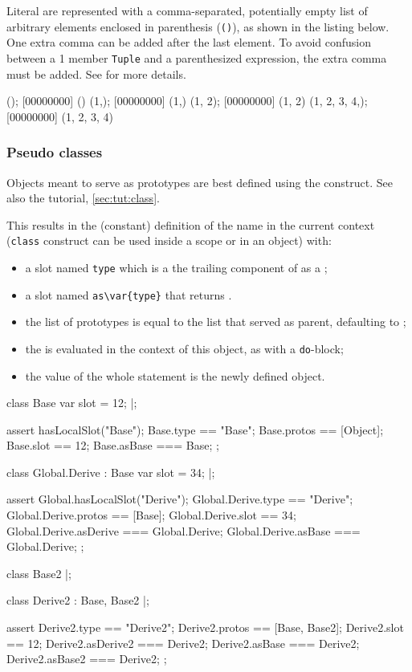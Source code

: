 Literal  are represented with a comma-separated, potentially
empty list of arbitrary elements enclosed in parenthesis (\lstinline|()|),
as shown in the listing below.  One extra comma can be added after the last
element.  To avoid confusion between a 1 member \lstinline{Tuple} and a
parenthesized expression, the extra comma must be added.  See
 for more details.

\begin{urbiscript}
();
[00000000] ()
(1,);
[00000000] (1,)
(1, 2);
[00000000] (1, 2)
(1, 2, 3, 4,);
[00000000] (1, 2, 3, 4)
\end{urbiscript}


\subsubsection{Pseudo classes}
\label{sec:lang:class}

Objects meant to serve as prototypes are best defined using the
 construct.  See also the tutorial, \autoref{sec:tut:class}.


This results in the (constant) definition of the name  in the
current context (\lstinline{class} construct can be used inside a scope or
in an object) with:
\begin{itemize}
\item a slot named \lstinline{type} which is a the trailing component of
   as a ;
\item a slot named \lstinline|as\var{type}| that returns \this.
\item the list of prototypes is equal to the list  that
  served as parent, defaulting to ;
\item the  is evaluated in the context of this object, as with a
  \lstinline{do}-block;
\item the value of the whole statement is the newly defined object.
\end{itemize}

\begin{urbiscript}
class Base
{
  var slot = 12;
}|;

assert
{
  hasLocalSlot("Base");
  Base.type   == "Base";
  Base.protos == [Object];
  Base.slot   == 12;
  Base.asBase === Base;
};

class Global.Derive : Base
{
  var slot = 34;
}|;

assert
{
  Global.hasLocalSlot("Derive");
  Global.Derive.type     == "Derive";
  Global.Derive.protos   == [Base];
  Global.Derive.slot     == 34;
  Global.Derive.asDerive === Global.Derive;
  Global.Derive.asBase   === Global.Derive;
};

class Base2 {}|;

class Derive2 : Base, Base2 {}|;

assert
{
  Derive2.type      == "Derive2";
  Derive2.protos    == [Base, Base2];
  Derive2.slot      == 12;
  Derive2.asDerive2 === Derive2;
  Derive2.asBase    === Derive2;
  Derive2.asBase2   === Derive2;
};
\end{urbiscript}

